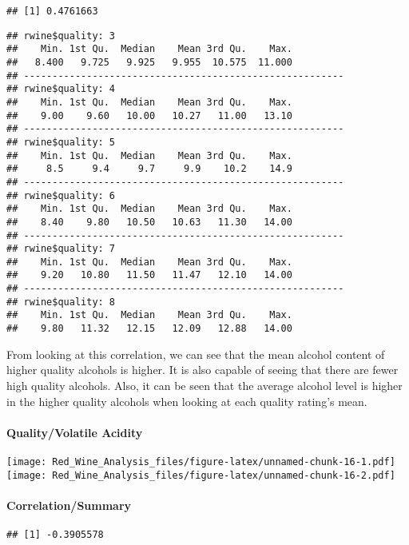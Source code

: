 \documentclass[]{article}
\let\oldparagraph\paragraph
\renewcommand{\paragraph}[1]{\oldparagraph{#1}\mbox{}}
\begin{document}
\begin{verbatim}
## [1] 0.4761663
\end{verbatim}

\begin{verbatim}
## rwine$quality: 3
##    Min. 1st Qu.  Median    Mean 3rd Qu.    Max. 
##   8.400   9.725   9.925   9.955  10.575  11.000 
## -------------------------------------------------------- 
## rwine$quality: 4
##    Min. 1st Qu.  Median    Mean 3rd Qu.    Max. 
##    9.00    9.60   10.00   10.27   11.00   13.10 
## -------------------------------------------------------- 
## rwine$quality: 5
##    Min. 1st Qu.  Median    Mean 3rd Qu.    Max. 
##     8.5     9.4     9.7     9.9    10.2    14.9 
## -------------------------------------------------------- 
## rwine$quality: 6
##    Min. 1st Qu.  Median    Mean 3rd Qu.    Max. 
##    8.40    9.80   10.50   10.63   11.30   14.00 
## -------------------------------------------------------- 
## rwine$quality: 7
##    Min. 1st Qu.  Median    Mean 3rd Qu.    Max. 
##    9.20   10.80   11.50   11.47   12.10   14.00 
## -------------------------------------------------------- 
## rwine$quality: 8
##    Min. 1st Qu.  Median    Mean 3rd Qu.    Max. 
##    9.80   11.32   12.15   12.09   12.88   14.00
\end{verbatim}

From looking at this correlation, we can see that the mean alcohol
content of higher quality alcohols is higher. It is also capable of
seeing that there are fewer high quality alcohols. Also, it can be seen
that the average alcohol level is higher in the higher quality alcohols
when looking at each quality rating's mean.

\hypertarget{qualityvolatile-acidity}{%
\paragraph{Quality/Volatile Acidity}\label{qualityvolatile-acidity}}

\texttt{[image: Red\_Wine\_Analysis\_files/figure-latex/unnamed-chunk-16-1.pdf]}
\texttt{[image: Red\_Wine\_Analysis\_files/figure-latex/unnamed-chunk-16-2.pdf]}

\hypertarget{correlationsummary-1}{%
\paragraph{Correlation/Summary}\label{correlationsummary-1}}

\begin{verbatim}
## [1] -0.3905578
\end{verbatim}
\end{document}
